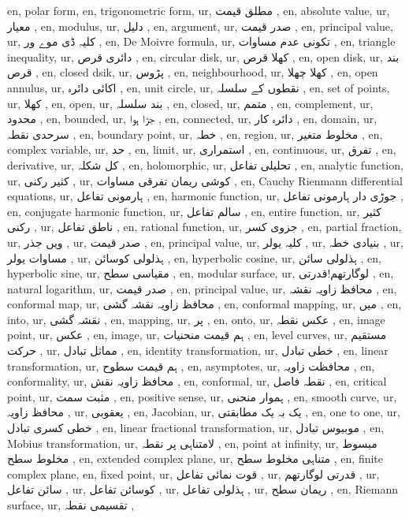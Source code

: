 en, polar form,
en, trigonometric form,
ur, مطلق قیمت ,
en, absolute value,
ur, معیار ,
en, modulus,
ur, دلیل ,
en, argument,
ur, صدر قیمت ,
en, principal value,
ur,  کلیہ ڈی موے ور ,
en, De Moivre formula,
ur, تکونی عدم مساوات ,
en, triangle inequality,
ur, دائری قرص ,
en, circular disk,
ur, کھلا قرص ,
en, open disk,
ur, بند قرص ,
en, closed dsik,
ur, پڑوس ,
en, neighbourhood,
ur, کھلا چھلا ,
en, open annulus,
ur, اکائی دائرہ ,
en, unit circle,
ur, نقطوں کے سلسلہ ,
en, set of points,
ur, کھلا ,
en, open,
ur, بند سلسلہ ,
en, closed,
ur, متمم ,
en, complement,
ur, محدود ,
en, bounded,
ur, جڑا ہوا ,
en, connected,
ur, دائرہ کار ,
en, domain,
ur, سرحدی نقطہ ,
en, boundary point,
ur, خطہ ,
en, region,
ur, مخلوط متغیر ,
en, complex variable,
ur, حد ,
en, limit,
ur, استمراری ,
en, continuous,
ur, تفرق ,
en, derivative,
ur, کل شکلہ ,
en, holomorphic,
ur, تحلیلی تفاعل ,
en, analytic function,
ur, کثیر رکنی ,
ur, کوشی ریمان تفرقی مساوات ,
en, Cauchy Rienmann differential equations,
ur, ہارمونی تفاعل ,
en, harmonic function,
ur, جوڑی دار ہارمونی تفاعل ,
en, conjugate harmonic function,
ur, سالم تفاعل ,
en, entire function,
ur, کثیر رکنی ,
ur, ناطق تفاعل ,
en, rational function,
ur, جزوی کسر ,
en, partial fraction,
ur, ویں جذر ,
ur, صدر قیمت ,
en, principal value,
ur, کلیہ یولر ,
ur, بنیادی خطہ ,
ur, مساوات یولر ,
ur, ہذلولی کوسائن ,
en, hyperbolic cosine,
ur, ہذلولی سائن ,
en, hyperbolic sine,
ur, مقیاسی سطح ,
en, modular surface,
ur, لوگارتھم!قدرتی ,
en, natural logarithm,
ur, صدر قیمت ,
en, principal value,
ur, محافظ زاویہ نقشہ ,
en, conformal map,
ur, محافظ زاویہ نقشہ گشی ,
en, conformal mapping,
ur, میں ,
en, into,
ur, نقشہ گشی ,
en, mapping,
ur, پر ,
en, onto,
ur, عکس نقطہ ,
en, image point,
ur, عکس ,
en, image,
ur, ہم قیمت منحنیات ,
en, level curves,
ur, مستقیم حرکت ,
ur, مماثل تبادل ,
en, identity transformation,
ur, خطی تبادل ,
en, linear transformation,
ur, ہم قیمت سطوح ,
en, asymptotes,
ur, محافظت زاویہ ,
en, conformality,
ur, محافظ زاویہ نقش ,
en, conformal,
ur, نقطہ فاصل ,
en, critical point,
ur, مثبت سمت ,
en, positive sense,
ur, ہموار منحنی ,
en, smooth curve,
ur, محافظ زاویہ ,
ur, یعقوبی ,
en, Jacobian,
ur, یک بہ یک مطابقتی ,
en, one to one,
ur, خطی کسری تبادل ,
en, linear fractional transformation,
ur, موبیوس تبادل ,
en, Mobius transformation,
ur, لامتناہی پر نقطہ ,
en, point at infinity,
ur, مبسوط مخلوط سطح ,
en, extended complex plane,
ur, متناہی مخلوط سطح ,
en, finite complex plane,
en, fixed point,
ur, قوت نمائی تفاعل ,
ur, قدرتی لوگارتھم ,
ur, سائن تفاعل ,
ur, کوسائن تفاعل ,
ur, ہذلولی تفاعل ,
ur, ریمان سطح ,
en, Riemann surface,
ur, تقسیمی نقطہ ,
